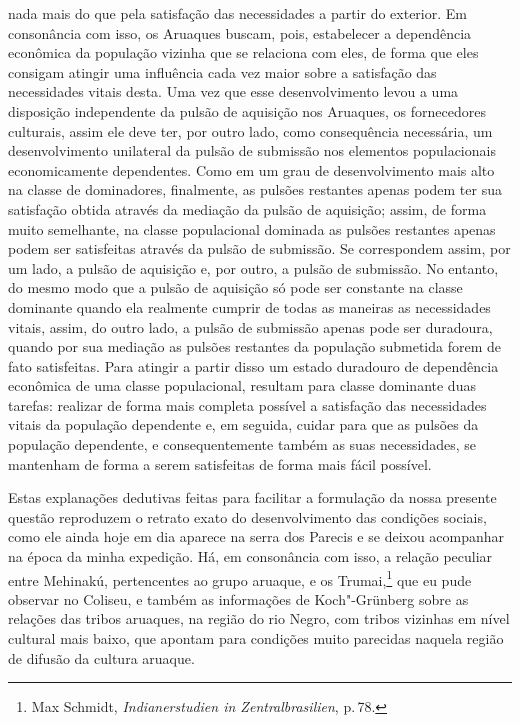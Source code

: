 nada mais do que pela satisfação das necessidades a partir do exterior.
Em consonância com isso, os Aruaques buscam, pois, estabelecer a
dependência econômica da população vizinha que se relaciona com eles, de
forma que eles consigam atingir uma influência cada vez maior sobre a
satisfação das necessidades vitais desta. Uma vez que esse
desenvolvimento levou a uma disposição independente da pulsão de
aquisição nos Aruaques, os fornecedores culturais, assim ele deve ter,
por outro lado, como consequência necessária, um desenvolvimento
unilateral da pulsão de submissão nos elementos populacionais
economicamente dependentes. Como em um grau de desenvolvimento mais alto
na classe de dominadores, finalmente, as pulsões restantes apenas podem
ter sua satisfação obtida através da mediação da pulsão de aquisição;
assim, de forma muito semelhante, na classe populacional dominada as
pulsões restantes apenas podem ser satisfeitas através da pulsão de
submissão. Se correspondem assim, por um lado, a pulsão de aquisição e,
por outro, a pulsão de submissão. No entanto, do mesmo modo que a pulsão
de aquisição só pode ser constante na classe dominante quando ela
realmente cumprir de todas as maneiras as necessidades vitais, assim, do
outro lado, a pulsão de submissão apenas pode ser duradoura, quando por
sua mediação as pulsões restantes da população submetida forem de fato
satisfeitas. Para atingir a partir disso um estado duradouro de
dependência econômica de uma classe populacional, resultam para classe
dominante duas tarefas: realizar de forma mais completa possível a
satisfação das necessidades vitais da população dependente e, em
seguida, cuidar para que as pulsões da população dependente, e
consequentemente também as suas necessidades, se mantenham de forma a
serem satisfeitas de forma mais fácil possível.

Estas explanações dedutivas feitas para facilitar a formulação da nossa
presente questão reproduzem o retrato exato do desenvolvimento das
condições sociais, como ele ainda hoje em dia aparece na serra dos
Parecis e se deixou acompanhar na época da minha expedição. Há, em
consonância com isso, a relação peculiar entre Mehinakú, pertencentes ao
grupo aruaque, e os Trumai,\footnote{Max Schmidt, \textit{Indianerstudien
  in Zentralbrasilien}, p.\,78.} que eu pude observar no Coliseu, e
também as informações de Koch"-Grünberg sobre as relações das tribos
aruaques, na região do rio Negro, com tribos vizinhas em nível cultural
mais baixo, que apontam para condições muito parecidas naquela região
de difusão da cultura aruaque.


